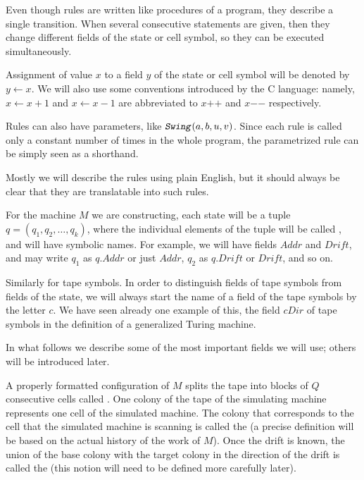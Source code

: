 \documentclass[12pt]{memoir}
\newcommand{\fld}[1]{\ensuremath{\textit{#1}}}
\newcommand{\rul}[1]{\ensuremath{\texttt{\slshape #1\/}}}
\newcommand{\Addr}{\fld{Addr}}
\newcommand{\cDir}{\fld{cDir}}
\newcommand{\Drift}{\fld{Drift}}
\newcommand{\increment}[1]{#1\mathord{+}\mathord{+}}
\newcommand{\decrement}[1]{#1\mathord{-}\mathord{-}}
\newcommand{\ruSwing}{\rul{Swing}}
\begin{document}
Even though rules are written like procedures of a program,
they describe a single transition.
When several consecutive statements are given, then they
change different fields of the state or
cell symbol, so they can be executed simultaneously.

Assignment of value \( x \) to a field \( y \) of the state or cell symbol will
be denoted by \( y \gets x \).
We will also use some conventions introduced by the C language:
namely,
\( x\gets x+1 \) and \( x\gets x-1 \) are abbreviated to \( \increment{x} \) and
\( \decrement{x} \) respectively.

Rules can also have parameters, like \( \ruSwing(a,b,u,v) \).
Since each rule is called only a constant number of times in the whole program,
the parametrized rule can be simply seen as a shorthand.

Mostly we will describe
the rules using plain English, but it should always be clear that they
are translatable into such rules.



\begin{sloppypar}
For the machine \( M \) we are constructing, each state will 
be a tuple \( q=(q_{1},q_{2},\dots,q_{k}) \),
where the individual elements of the tuple will be called , and will
have symbolic names.
For example, we will have fields \( \Addr \) and \( \Drift \),
and may write \( q_{1} \) as \( q.\Addr \) or just \( \Addr \), 
\( q_{2} \) as \( q.\Drift \) or \( \Drift \), and so on.
\end{sloppypar}

Similarly for tape symbols.
In order to distinguish fields of tape symbols from fields of the state,
we will always start the name of a field of the tape symbols by the letter \( c \).
We have seen already one example of this, the field \( \cDir \) of tape symbols
in the definition of a generalized Turing machine.

In what follows we describe some of the most important fields we will use;
others will be introduced later.

A properly formatted configuration of \( M \) splits the tape into blocks of \( Q \)
consecutive cells called .
One colony of the tape of the simulating
machine represents one cell of the simulated machine.
The colony that corresponds to the cell that the
simulated machine is scanning is called the 
(a precise definition will be based on the actual history of the work of \( M \)).
Once the drift is known, the union of the base colony with the target colony in
the direction of the drift is called the  (this notion will 
need to be defined more carefully later).
\end{document}
